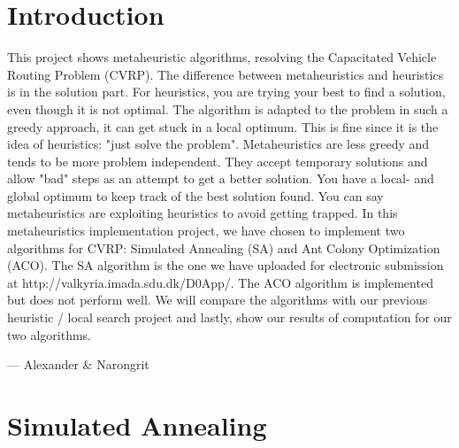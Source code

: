 \documentclass[12pt]{article}
\begin{document}

\tableofcontents
\pagebreak


\section{Introduction}

This project shows metaheuristic algorithms, resolving the Capacitated Vehicle Routing Problem (CVRP). The difference between metaheuristics and heuristics is in 
the solution part. For heuristics, you are trying your best to find a solution, even though it is not optimal. The algorithm is adapted to the problem
in such a greedy approach, it can get stuck in a local optimum. This is fine since it is the idea of heuristics: "just solve the problem". 
\newline
Metaheuristics are less greedy and tends to be more problem independent. They accept temporary solutions and allow "bad" steps as an attempt to get
a better solution. You have a local- and global optimum to keep track of the best solution found. You can say metaheuristics are exploiting
heuristics to avoid getting trapped. 
\newline
In this metaheuristics implementation project, we have chosen to implement two algorithms for CVRP: Simulated Annealing (SA) and Ant Colony Optimization (ACO). 
The SA algorithm is the one we have uploaded for electronic submission at http://valkyria.imada.sdu.dk/D0App/. The ACO algorithm is implemented but does not perform well.
We will compare the algorithms with our previous heuristic / local search project and lastly, show our results of computation for our two algorithms.

\hspace{1 cm}--- Alexander \& Narongrit

\newpage

\section{Simulated Annealing} 
\end{document}
